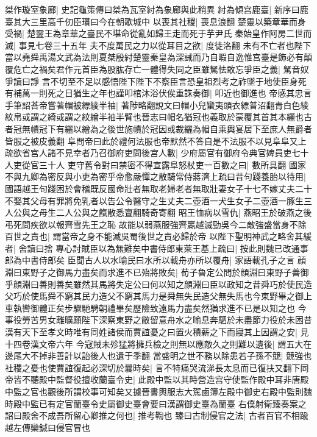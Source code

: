 桀作璇室象廊|{
	史記龜策傳曰桀為瓦室紂為象廊與此稍異}
紂為傾宫鹿臺|{
	新序曰鹿臺其大三里高千仞臣瓚曰今在朝歌城中}
以喪其社稷|{
	喪息浪翻}
楚靈以築章華而身受禍|{
	楚靈王為章華之臺民不堪命從亂如歸王走而死于芋尹氏}
秦始皇作阿房二世而滅|{
	事見七卷三十五年}
夫不度萬民之力以從耳目之欲|{
	度徒洛翻}
未有不亡者也陛下當以堯舜禹湯文武為法則夏桀殷紂楚靈秦皇為深誡而乃自暇自逸惟宫臺是飾必有顛覆危亡之禍矣君作元首臣為股肱存亡一體得失同之臣雖駑怯敢忘爭臣之義|{
	駑音奴爭讀曰諍}
言不切至不足以感悟陛下陛下不察臣言恐皇祖烈考之祚墜于地使臣身死有補萬一則死之日猶生之年也謹叩棺沐浴伏俟重誅奏御|{
	叩近也御進也}
帝感其忠言手筆詔荅帝嘗著帽被縹綾半袖|{
	著陟略翻說文曰帽小兒蠻夷頭衣縹普沼翻青白色綾紋帛或謂之綺或謂之紋繒半袖半臂也晉志曰帽名猶冠也義取於蒙覆其首其本纚也古者冠無幘冠下有纚以繒為之後世施幘於冠因或裁纚為帽自乘輿宴居下至庶人無爵者皆服之被皮義翻}
阜問帝曰此於禮何法服也帝默然不答自是不法服不以見阜阜又上疏欲省宫人諸不見幸者乃召御府吏問後宫人數|{
	少府屬官有御府令典官婢員吏七十人吏從官三十人}
吏守舊令對曰禁密不得宣露阜怒杖吏一百數之曰|{
	數所具翻}
國家不與九卿為密反與小吏為密乎帝愈嚴憚之散騎常侍蔣濟上疏曰昔句踐養胎以待用|{
	國語越王句踐困於會稽既反國命壯者無取老婦老者無取壯妻女子十七不嫁丈夫二十不娶其父母有罪將免乳者以告公令醫守之生丈夫二壺酒一犬生女子二壺酒一豚生三人公與之母生二人公與之餼散悉亶翻騎奇寄翻}
昭王恤病以雪仇|{
	燕昭王於破燕之後弔死問疾欲以報齊雪先王之恥}
故能以弱燕服強齊羸越滅勁吳今二敵強盛當身不除百世之責也|{
	謂當帝之身不能滅吳蜀後世之責必歸於帝}
以陛下聖明神武之略舍其緩者|{
	舍讀曰捨}
專心討賊臣以為無難矣中書侍郎東萊王基上疏曰|{
	按此則魏已改通事郎為中書侍郎矣}
臣聞古人以水喻民曰水所以載舟亦所以覆舟|{
	家語載孔子之言}
顔淵曰東野子之御馬力盡矣而求進不已殆將敗矣|{
	荀子魯定公問於顔淵曰東野子善御乎顔淵曰善則善矣雖然其馬將失定公曰何以知之顔淵曰臣以政知之昔舜巧於使民造父巧於使馬舜不窮其民力造父不窮其馬力是舜無失民造父無失馬也今東野畢之御上車執轡御體正矣步驟馳騁朝禮畢矣歷險致遠馬力盡矣然猶求進不已是以知之也}
今事役勞苦男女離曠願陛下深察東野之敝留意舟水之喻息奔駟於未盡節力役於未困昔漢有天下至孝文時唯有同姓諸侯而賈誼憂之曰置火積薪之下而寢其上因謂之安|{
	見十四卷漢文帝六年}
今寇賊未殄猛將擁兵檢之則無以應敵久之則難以遺後|{
	謂五大在邊尾大不掉非善計以詒後人也遺于季翻}
當盛明之世不務以除患若子孫不競|{
	競強也}
社稷之憂也使賈誼復起必深切於曩時矣|{
	言不特痛哭流涕長太息而已復扶又翻下同}
帝皆不聽殿中監督役擅收蘭臺令史|{
	此殿中監以其時營造宫守使監作殿中耳非唐殿中監之官也觀後所謂校事可知矣又據晉書輿服志大駕鹵簿左殿中御史右殿中監則魏時殿中監已有定官蘭臺令史屬御史臺會要曰漢謂御史臺為蘭臺}
右僕射衛臻奏案之詔曰殿舍不成吾所留心卿推之何也|{
	推考鞫也}
臻曰古制侵官之法|{
	古者百官不相踰越左傳欒鍼曰侵官冒也}
